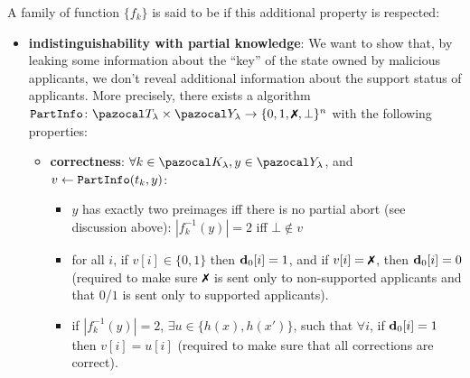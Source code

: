 \begin{definition}\label{def:GHZcanCapable}
  A \AssumpFct{} family of function $\{f_k\}$ is said to be \AssumpFctCan{} if this additional property is respected:
  \begin{itemize}
    \item \textbf{indistinguishability with partial knowledge}: We want to show that, by leaking some information about the ``key'' of the \GHZ{} state owned by malicious applicants, we don't reveal additional information about the support status of applicants. More precisely, there exists a \PPT{} algorithm $\partialInfo\colon \cT_\lambda \times \cY_\lambda \rightarrow \{0,1,\cross,\bot\}^n$ with the following properties:
          \begin{itemize}
            \item
                  \textbf{correctness}: $\forall k \in \cK_\lambda, y \in \cY_\lambda$, and $v \gets {\tt PartInfo}(t_k, y)$:
                  \begin{itemize}
                    \item $y$ has exactly two preimages iff there is no partial abort (see discussion above): $|f_k^{-1}(y)| = 2$ iff $\bot \notin v$
                    \item for all $i$, if $v[i] \in \{0,1\}$ then $\mathbf{d}_0[i] = 1$, and if $v[i] = \cross$, then $\mathbf{d}_0[i] = 0$ (required to make sure $\cross$ is sent only to non-supported applicants and that $0$/$1$ is sent only to supported applicants).
                    \item if $|f_k^{-1}(y)| = 2$, $\exists u \in \{h(x),h(x')\}$, such that  $\forall i$, if $\mathbf{d}_0[i] = 1$ then $v[i] = u[i]$ (required to make sure that all corrections are correct).
                  \end{itemize}
          \end{itemize}
          \begin{minipage}[t]{0.64\linewidth}%
            \vspace*{-.7em}
\end{minipage}
\end{itemize}
\end{definition}
